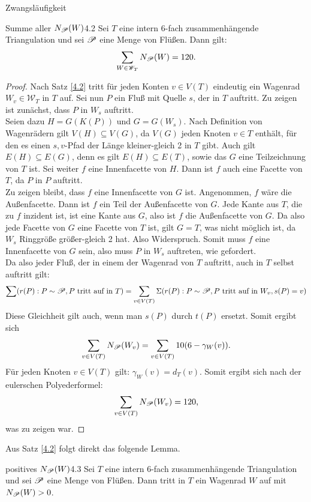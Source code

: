 \begin{section}{Zwangsläufigkeit}
 \begin{satzl}{Summe aller $N_{\mathscr{P}}(W)$}{4.2}
  Sei $T$ eine intern 6-fach zusammenhängende Triangulation und sei $\mathscr{P}$ eine Menge von Flüßen. Dann gilt:
  \[\sum_{W\in \mathscr{W}_T} N_{\mathscr{P}}(W) = 120\text{.}\]
 \end{satzl}
 \begin{proof}
  Nach Satz \ref{4.2} tritt für jeden Konten $v \in V(T)$ eindeutig ein Wagenrad $W_v \in \mathscr{W}_T$ in $T$ auf. Sei nun $P$ ein Fluß mit Quelle $s$, der in $T$ auftritt. Zu zeigen ist zunächst, dass $P$ in $W_s$ auftritt.\\
  Seien dazu $H=G(K(P))$ und $G=G(W_s)$. Nach Definition von Wagenrädern gilt $V(H) \subseteq V(G)$, da $V(G)$ jeden Knoten $v \in T$ enthält, für den es einen $s,v$-Pfad   der Länge kleiner-gleich 2 in $T$ gibt. Auch gilt $E(H) \subseteq E(G)$, denn es gilt $E(H) \subseteq E(T)$, sowie das $G$ eine Teilzeichnung von $T$ ist. Sei weiter $f$ eine Innenfacette von $H$. Dann ist $f$ auch eine Facette von $T$, da $P$ in $P$ auftritt.\\
  Zu zeigen bleibt, dass $f$ eine Innenfacette von $G$ ist. Angenommen, $f$ wäre die Außenfacette. Dann ist $f$ ein Teil der Außenfacette von $G$. Jede Kante aus $T$, die zu $f$ inzident ist, ist eine Kante aus $G$, also ist $f$ die Außenfacette von $G$. Da also jede Facette von $G$ eine Facette von $T$ ist, gilt $G=T$, was nicht möglich ist, da $W_s$ Ringgröße größer-gleich 2 hat. Also Widerspruch. Somit muss $f$ eine Innenfacette von $G$ sein, also muss $P$ in $W_s$ auftreten, wie gefordert.\\
  Da also jeder Fluß, der in einem der Wagenrad von $T$ auftritt, auch in $T$ selbst auftritt gilt:
  \[\sum (r(P):P\sim \mathscr{P}, P \text{ tritt auf in } T) = \sum_{v\in V(T)} \Sigma (r(P):P\sim \mathscr{P}, P \text{ tritt auf in } W_v,s(P)=v)\]
  Diese Gleichheit gilt auch, wenn man $s(P)$ durch $t(P)$ ersetzt. Somit ergibt sich
  \[\sum_{v\in V(T)} N_{\mathscr{P}}(W_v) = \sum_{v\in V(T)} 10(6-\gamma_W(v))\text{.}\]
  Für jeden Knoten $v \in V(T)$ gilt: $\gamma_W(v) = d_T(v)$. Somit ergibt sich nach der eulerschen Polyederformel:
  \[\sum_{v\in V(T)} N_{\mathscr{P}}(W_v) = 120\text{,}\]
  was zu zeigen war.
 \end{proof}

 Aus Satz \ref{4.2} folgt direkt das folgende Lemma.
 
 \begin{lemmal}{positives $N_{\mathscr{P}} (W)$}{4.3}
  Sei $T$ eine intern 6-fach zusammenhängende Triangulation und sei $\mathscr{P}$ eine Menge von Flüßen. Dann tritt in $T$ ein Wagenrad $W$ auf mit $N_{\mathscr{P}} (W) > 0$.
 \end{lemmal}
 

\end{section}
